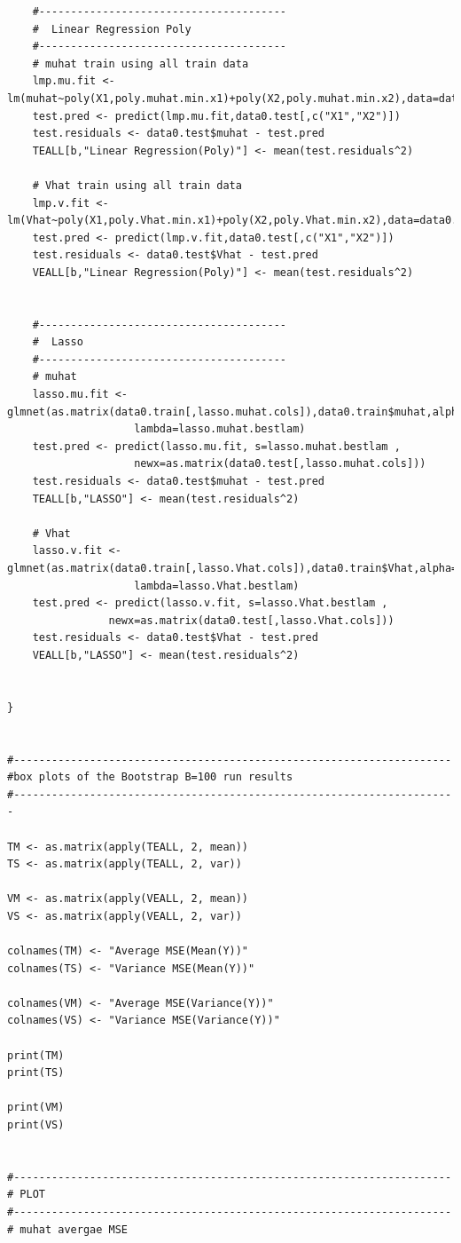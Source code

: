 \documentclass[twoside,12pt]{article}
\begin{document}
\begin{verbatim}
	#---------------------------------------
	#  Linear Regression Poly
	#---------------------------------------
	# muhat train using all train data
	lmp.mu.fit <- lm(muhat~poly(X1,poly.muhat.min.x1)+poly(X2,poly.muhat.min.x2),data=data0.train)
	test.pred <- predict(lmp.mu.fit,data0.test[,c("X1","X2")])
	test.residuals <- data0.test$muhat - test.pred
	TEALL[b,"Linear Regression(Poly)"] <- mean(test.residuals^2)

	# Vhat train using all train data
	lmp.v.fit <- lm(Vhat~poly(X1,poly.Vhat.min.x1)+poly(X2,poly.Vhat.min.x2),data=data0.train)
	test.pred <- predict(lmp.v.fit,data0.test[,c("X1","X2")])
	test.residuals <- data0.test$Vhat - test.pred
	VEALL[b,"Linear Regression(Poly)"] <- mean(test.residuals^2)


	#---------------------------------------
	#  Lasso
	#---------------------------------------
	# muhat
	lasso.mu.fit <- glmnet(as.matrix(data0.train[,lasso.muhat.cols]),data0.train$muhat,alpha=1, 
					lambda=lasso.muhat.bestlam)
	test.pred <- predict(lasso.mu.fit, s=lasso.muhat.bestlam , 
					newx=as.matrix(data0.test[,lasso.muhat.cols]))
	test.residuals <- data0.test$muhat - test.pred
	TEALL[b,"LASSO"] <- mean(test.residuals^2)

	# Vhat
	lasso.v.fit <- glmnet(as.matrix(data0.train[,lasso.Vhat.cols]),data0.train$Vhat,alpha=1, 
					lambda=lasso.Vhat.bestlam)
	test.pred <- predict(lasso.v.fit, s=lasso.Vhat.bestlam , 
				newx=as.matrix(data0.test[,lasso.Vhat.cols]))
	test.residuals <- data0.test$Vhat - test.pred
	VEALL[b,"LASSO"] <- mean(test.residuals^2)


}


#---------------------------------------------------------------------
#box plots of the Bootstrap B=100 run results
#----------------------------------------------------------------------

TM <- as.matrix(apply(TEALL, 2, mean))
TS <- as.matrix(apply(TEALL, 2, var))

VM <- as.matrix(apply(VEALL, 2, mean))
VS <- as.matrix(apply(VEALL, 2, var))

colnames(TM) <- "Average MSE(Mean(Y))"
colnames(TS) <- "Variance MSE(Mean(Y))"

colnames(VM) <- "Average MSE(Variance(Y))"
colnames(VS) <- "Variance MSE(Variance(Y))"

print(TM)
print(TS)

print(VM)
print(VS)


#---------------------------------------------------------------------
# PLOT
#---------------------------------------------------------------------
# muhat avergae MSE


\end{verbatim}
\end{document}
